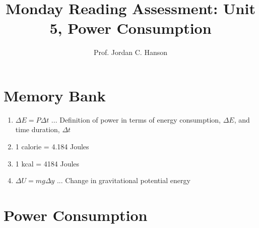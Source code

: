 \documentclass{article}
\begin{document}
\twocolumn

\title{Monday Reading Assessment: Unit 5, Power Consumption}
\author{Prof. Jordan C. Hanson}

\maketitle

\section{Memory Bank}

\begin{enumerate}
\item $\Delta E = P\Delta t$ ... Definition of power in terms of energy consumption, $\Delta E$, and time duration, $\Delta t$
\item 1 calorie = 4.184 Joules
\item 1 kcal = 4184 Joules
\item $\Delta U = m g \Delta y$ ... Change in gravitational potential energy
\end{enumerate}

\section{Power Consumption}
\end{document}
